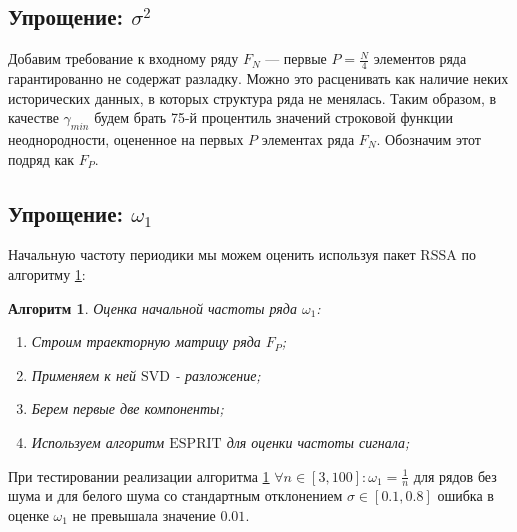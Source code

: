 \documentclass[specialist, substylefile = spbu.rtx,
			   subf, href, 12pt]{disser}
\newtheorem{algorithm}{Алгоритм}
\begin{document}
\subsection{Упрощение: $ \sigma^2 $}
Добавим требование к входному ряду $ F_N $ --- первые $ P = \frac{N}{4} $ элементов ряда гарантированно не содержат разладку. Можно это расценивать как наличие неких исторических данных, в которых структура ряда не менялась. Таким образом, в качестве $ \gamma_{min} $ будем брать 75-й процентиль значений строковой функции неоднородности, оцененное на первых $ P $ элементах ряда $ F_N $. Обозначим этот подряд как $ F_P $.

\subsection{Упрощение: $ \omega_1 $}
Начальную частоту периодики мы можем оценить используя пакет $ \mathrm{RSSA} $ по алгоритму \ref{algo:estimate_omega_1}:
\begin{algorithm}\label{algo:estimate_omega_1}
	Оценка начальной частоты ряда $ \omega_1 $:
	\begin{enumerate}
		\item Строим траекторную матрицу ряда $ F_P $;
		\item Применяем к ней $ \mathrm{SVD} $ - разложение;
		\item Берем первые две компоненты;
		\item Используем алгоритм $ \mathrm{ESPRIT} $ \cite{epsrit} для оценки частоты сигнала;
	\end{enumerate}
\end{algorithm}

При тестировании реализации алгоритма \ref{algo:estimate_omega_1} $ \forall n \in [3, 100]: \omega_1 = \frac{1}{n}$ для рядов без шума и для белого шума со стандартным отклонением $ \sigma \in [0.1, 0.8] $ ошибка в оценке $ \omega_1 $ не превышала значение $ 0.01 $.
\end{document}
